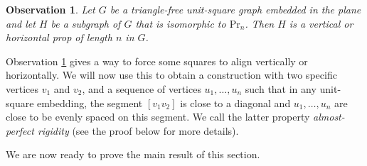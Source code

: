 \documentclass[a4paper,reqno, 12pt]{amsart}
\newtheorem{observation}[theorem]{Observation}
\begin{document}
\begin{observation}\label{obs:usg5}
Let $G$ be a triangle-free unit-square graph embedded in the plane
and let $H$ be a subgraph of $G$ that is isomorphic to $\mathrm{Pr}_n$. Then $H$ is a vertical or
horizontal prop of length $n$ in $G$.
\end{observation}

Observation \ref{obs:usg5} gives a way to force some squares to align
vertically or horizontally. We will now use this to obtain a
construction with two specific vertices $v_1$ and $v_2$, and a
sequence of vertices $u_1,\ldots,u_n$ such that in any unit-square
embedding, the segment $[v_1v_2]$ is close to a diagonal and
$u_1,\ldots,u_n$ are close to be evenly spaced on this segment. We
call the latter property \emph{almost-perfect rigidity} (see the proof
below for more details).

\smallskip

We are now ready to prove the main result of this section.
\end{document}
